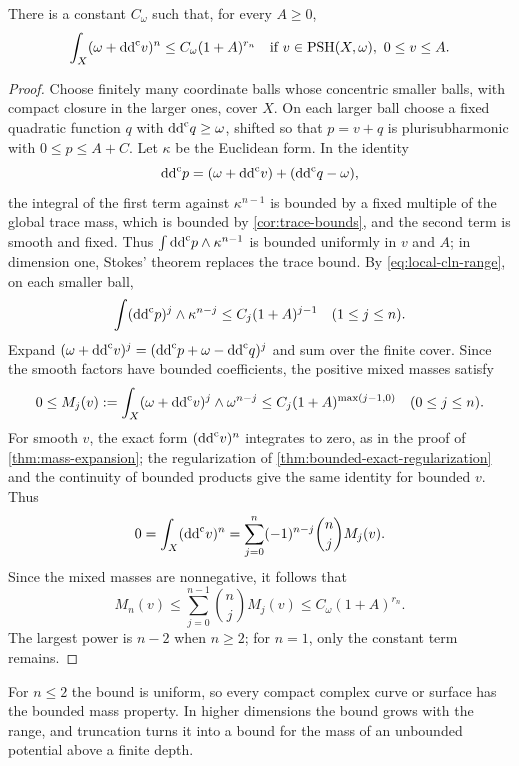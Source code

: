 \begin{proposition}\label{prop:gauduchon-range-growth}\label{lem:bounded-range-mass}
There is a constant $C_\omega$ such that, for every $A\geq0$,
\[
 \int_X(\omega+\mathrm{dd}^{\mathrm{c}} v)^n\leq C_\omega(1+A)^{r_n}
\quad\text{if }v\in\mathrm{PSH}(X,\omega),\ 0\leq v\leq A.
\]
\end{proposition}
\begin{proof}
Choose finitely many coordinate balls whose concentric smaller balls, with compact closure in the larger ones, cover $X$. On each larger ball choose a fixed quadratic function $q$ with $\mathrm{dd}^{\mathrm{c}} q\geq\omega$, shifted so that $p=v+q$ is plurisubharmonic with $0\leq p\leq A+C$. Let $\kappa$ be the Euclidean form. In the identity
\[
 \mathrm{dd}^{\mathrm{c}} p=(\omega+\mathrm{dd}^{\mathrm{c}} v)+(\mathrm{dd}^{\mathrm{c}} q-\omega),
\]
the integral of the first term against $\kappa^{n-1}$ is bounded by a fixed multiple of the global trace mass, which is bounded by \cref{cor:trace-bounds}, and the second term is smooth and fixed. Thus $\int\mathrm{dd}^{\mathrm{c}} p\wedge\kappa^{n-1}$ is bounded uniformly in $v$ and $A$; in dimension one, Stokes' theorem replaces the trace bound. By \eqref{eq:local-cln-range}, on each smaller ball,
\[
 \int(\mathrm{dd}^{\mathrm{c}} p)^j\wedge\kappa^{n-j}\leq C_j(1+A)^{j-1}
 \quad(1\leq j\leq n).
\]
Expand $(\omega+\mathrm{dd}^{\mathrm{c}} v)^j=(\mathrm{dd}^{\mathrm{c}} p+\omega-\mathrm{dd}^{\mathrm{c}} q)^j$ and sum over the finite cover. Since the smooth factors have bounded coefficients, the positive mixed masses satisfy
\[
 0\leq M_j(v):=\int_X(\omega+\mathrm{dd}^{\mathrm{c}} v)^j\wedge\omega^{n-j}
 \leq C_j(1+A)^{\max(j-1,0)}
 \quad(0\leq j\leq n).
\]
For smooth $v$, the exact form $(\mathrm{dd}^{\mathrm{c}} v)^n$ integrates to zero, as in the proof of \cref{thm:mass-expansion}; the regularization of \cref{thm:bounded-exact-regularization} and the continuity of bounded products give the same identity for bounded $v$. Thus
\[
 0=\int_X(\mathrm{dd}^{\mathrm{c}} v)^n
   =\sum_{j=0}^n(-1)^{n-j}\binom nj M_j(v).
\]
Since the mixed masses are nonnegative, it follows that
\[
 M_n(v)\leq\sum_{j=0}^{n-1}\binom nj M_j(v)
          \leq C_\omega(1+A)^{r_n}.
\]
The largest power is $n-2$ when $n\geq2$; for $n=1$, only the constant term remains.
\end{proof}

For $n\leq2$ the bound is uniform, so every compact complex curve or surface has the bounded mass property. In higher dimensions the bound grows with the range, and truncation turns it into a bound for the mass of an unbounded potential above a finite depth.

